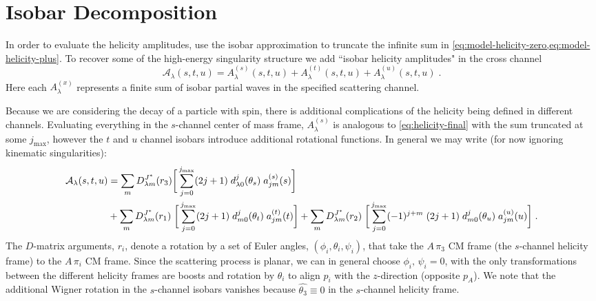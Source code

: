\section{Isobar Decomposition} \label{sec:isobar-decomp}
In order to evaluate the helicity amplitudes, use the isobar approximation to truncate the infinite sum in \cref{eq:model-helicity-zero,eq:model-helicity-plus}. To recover some of the high-energy singularity structure we add ``isobar helicity amplitudes" in the cross channel
  \begin{equation}
    \label{eq:isobar-def}
    \mathcal{A}_\lambda(s,t,u) = A_\lambda^{(s)}(s,t,u) +  A_\lambda^{(t)}(s,t,u) + A_\lambda^{(u)}(s,t,u) \; .
  \end{equation}
Here each \(A_\lambda^{(x)}\) represents a finite sum of isobar partial waves in the specified scattering channel.

 Because we are considering the decay of a particle with spin, there is additional complications of the helicity being defined in different channels. Evaluating everything in the \(s\)-channel center of mass frame, \(A_\lambda^{(s)}\) is analogous  to \cref{eq:helicity-final} with the sum truncated at some \(j_\text{max}\), however the \(t\) and \(u\) channel isobars introduce additional rotational functions.
 In general we may write (for now ignoring kinematic singularities):
 \begin{align}
   \label{eq:iso-D-matrix}
    \mathcal{A}_\lambda(s,t,u) &= \sum_{m} D^{J^*}_{\lambda m}(r_3)
    \bigg [
    \sum_{j = 0}^{{j_\text{max}}} (2j+1) \; d_{\lambda0}^j(\theta_s) \; a_{ j m}^{(s)}(s)
    \bigg ]
     \nonumber \\
    &+ \sum_{m} D^{J^*}_{\lambda m}(r_1) \;
    \bigg[
    \sum_{j = 0}^{{j_\text{max}}} (2j+1) \;d_{m0}^j (\theta_t) \; a_{j m}^{(t)}(t)
    \bigg]
    + \sum_{m} D^{J^*}_{\lambda m}(r_2) \;
    \bigg[
    \sum_{j = 0}^{{j_\text{max}}} (-1)^{j + m} \; (2j+1) \;d_{m0}^j(\theta_u) \; a_{j m}^{(u)}(u)
    \bigg] \; .
 \end{align}
 The \(D\)-matrix arguments, \(r_i\), denote a rotation by a set of Euler angles, \((\phi_i,\theta_i,\psi_i)\), that take the \(A \, \pi_3\) CM frame (the \(s\)-channel helicity frame) to the \(A \, \pi_i\) CM frame. Since the scattering process is planar, we can in general choose \(\phi_i, \,\psi_i = 0\), with the only transformations between the different helicity frames are boosts and rotation by \(\theta_i\) to align \(p_i\) with the \(z\)-direction (opposite \(p_A\)). We note that the additional Wigner rotation in the \(s\)-channel isobars vanishes because \(\hat{\theta_3} \equiv 0\)
 in the \(s\)-channel helicity frame.

